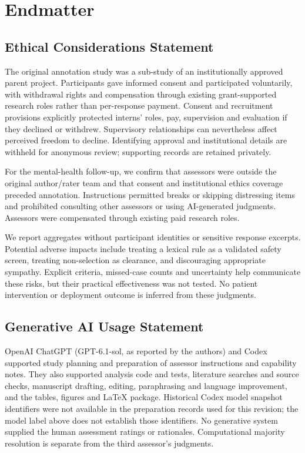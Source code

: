 \documentclass[manuscript,screen,review,anonymous]{acmart}
\begin{document}
\clearpage
\section*{Endmatter}
\subsection*{Ethical Considerations Statement}
The original annotation study was a sub-study of an institutionally approved parent project. Participants gave informed consent and participated voluntarily, with withdrawal rights and compensation through existing grant-supported research roles rather than per-response payment. Consent and recruitment provisions explicitly protected interns' roles, pay, supervision and evaluation if they declined or withdrew. Supervisory relationships can nevertheless affect perceived freedom to decline. Identifying approval and institutional details are withheld for anonymous review; supporting records are retained privately.

For the mental-health follow-up, we confirm that assessors were outside the original author/rater team and that consent and institutional ethics coverage preceded annotation. Instructions permitted breaks or skipping distressing items and prohibited consulting other assessors or using AI-generated judgments. Assessors were compensated through existing paid research roles.

We report aggregates without participant identities or sensitive response excerpts. Potential adverse impacts include treating a lexical rule as a validated safety screen, treating non-selection as clearance, and discouraging appropriate sympathy. Explicit criteria, missed-case counts and uncertainty help communicate these risks, but their practical effectiveness was not tested. No patient intervention or deployment outcome is inferred from these judgments.

\subsection*{Generative AI Usage Statement}
OpenAI ChatGPT (GPT-6.1-sol, as reported by the authors) and Codex supported study planning and preparation of assessor instructions and capability notes. They also supported analysis code and tests, literature searches and source checks, manuscript drafting, editing, paraphrasing and language improvement, and the tables, figures and LaTeX package. Historical Codex model snapshot identifiers were not available in the preparation records used for this revision; the model label above does not establish those identifiers. No generative system supplied the human assessment ratings or rationales. Computational majority resolution is separate from the third assessor's judgments.
\end{document}

